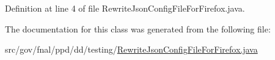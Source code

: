 Definition at line 4 of file Rewrite\-Json\-Config\-File\-For\-Firefox.\-java.



The documentation for this class was generated from the following file\-:\begin{DoxyCompactItemize}
\item 
src/gov/fnal/ppd/dd/testing/\hyperlink{RewriteJsonConfigFileForFirefox_8java}{Rewrite\-Json\-Config\-File\-For\-Firefox.\-java}\end{DoxyCompactItemize}
